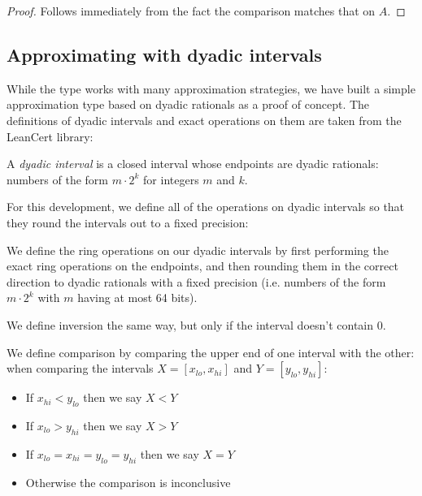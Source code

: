 \begin{proof}
  \leanok
  Follows immediately from the fact the comparison matches that on $A$.
\end{proof}

\subsection{Approximating with dyadic intervals}
\label{sec:dyadicInterval}
While the  type works with many approximation strategies, we have
built a simple approximation type based on dyadic rationals as a proof of
concept. The definitions of dyadic intervals and exact operations on them are
taken from the LeanCert library:

\begin{definition}
  \label{def:dyadicInterval}
  \mathlibok %
  A \emph{dyadic interval} is a closed interval whose endpoints are dyadic
  rationals: numbers of the form $m\cdot2^k$ for integers $m$ and $k$.
\end{definition}

For this development, we define all of the operations on dyadic intervals so
that they round the intervals out to a fixed precision:

\begin{definition}
  \label{def:dyadicOps}
  \leanok
  We define the ring operations on our dyadic intervals by first performing the
  exact ring operations on the endpoints, and then rounding them in the correct
  direction to dyadic rationals with a fixed precision (i.e. numbers of the form
  $m \cdot 2^k$ with $m$ having at most 64 bits).

  We define inversion the same way, but only if the interval doesn't contain 0.

  We define comparison by comparing the upper end of one interval with the
  other: when comparing the intervals $X = [x_{lo}, x_{hi}]$ and $Y = [y_{lo},
  y_{hi}]$:\begin{itemize}
    \item If $x_{hi} < y_{lo}$ then we say $X < Y$
    \item If $x_{lo} > y_{hi}$ then we say $X > Y$
    \item If $x_{lo} = x_{hi} = y_{lo} = y_{hi}$ then we say $X = Y$
    \item Otherwise the comparison is inconclusive
  \end{itemize}
\end{definition}

